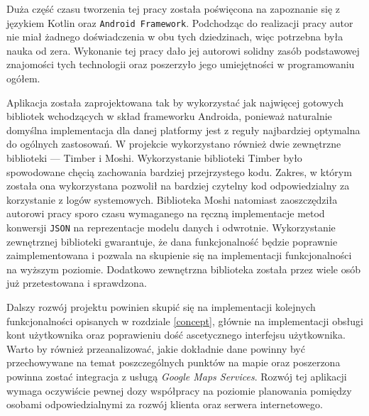 \documentclass[polish,polish,a4paper,12pt]{article}
\let\sectioncmd\section
\renewcommand{\section}{\clearpage\sectioncmd}
\begin{document}
Duża część czasu tworzenia tej pracy została poświęcona na zapoznanie się z językiem Kotlin oraz \texttt{Android Framework}. Podchodząc do realizacji pracy autor nie miał żadnego doświadczenia w obu tych dziedzinach, więc potrzebna była nauka od zera. Wykonanie tej pracy dało jej autorowi solidny zasób podstawowej znajomości tych technologii oraz poszerzyło jego umiejętności w programowaniu ogółem.

Aplikacja została zaprojektowana tak by wykorzystać jak najwięcej gotowych bibliotek wchodzących w skład frameworku Androida, ponieważ naturalnie domyślna implementacja dla danej platformy jest z reguły najbardziej optymalna do ogólnych zastosowań. W projekcie wykorzystano również dwie zewnętrzne biblioteki — Timber i Moshi. Wykorzystanie biblioteki Timber było spowodowane chęcią zachowania bardziej przejrzystego kodu. Zakres, w którym została ona wykorzystana pozwolił na bardziej czytelny kod odpowiedzialny za korzystanie z logów systemowych. Biblioteka Moshi natomiast zaoszczędziła autorowi pracy sporo czasu wymaganego na ręczną implementacje metod konwersji \texttt{JSON} na reprezentacje modelu danych i odwrotnie. Wykorzystanie zewnętrznej biblioteki gwarantuje, że dana funkcjonalność będzie poprawnie zaimplementowana i pozwala na skupienie się na implementacji funkcjonalności na wyższym poziomie. Dodatkowo zewnętrzna biblioteka została przez wiele osób już przetestowana i sprawdzona.

Dalszy rozwój projektu powinien skupić się na implementacji kolejnych funkcjonalności opisanych w rozdziale \ref{concept}, głównie na implementacji obsługi kont użytkownika oraz poprawieniu dość ascetycznego interfejsu użytkownika. Warto by również przeanalizować, jakie dokładnie dane powinny być przechowywane na temat poszczególnych punktów na mapie oraz poszerzona powinna zostać integracja z usługą \textit{Google Maps Services}. Rozwój tej aplikacji wymaga oczywiście pewnej dozy współpracy na poziomie planowania pomiędzy osobami odpowiedzialnymi za rozwój klienta oraz serwera internetowego.

\printbibliography[heading=bibintoc,title={Literatura}]

\renewcommand{\section}{\sectioncmd}
\clearpage

\listoffigures

\listoflistings
\end{document}
